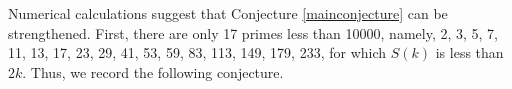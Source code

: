 \documentclass[11pt,reqno]{amsart}
\theoremstyle{plain}
\numberwithin{equation}{section}
\begin{document}

Numerical calculations suggest that Conjecture \ref{mainconjecture} can be strengthened. First, there are only 17 primes less than 10000, namely,     2, 3, 5, 7, 11, 13, 17, 23, 29, 41, 53, 59, 83, 113, 149, 179, 233,  for which $S(k)$ is  less than $2k$.  Thus, we record the following conjecture.
\end{document}
